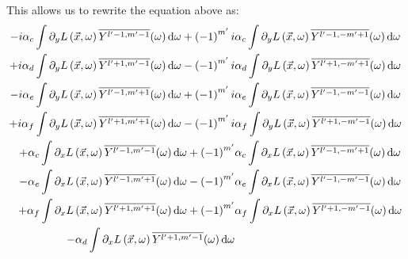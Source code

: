 \documentclass[10pt]{scrartcl}
\begin{document}
This allows us to rewrite the equation above as:
\begin{align*}
-i\alpha_c\int{\partial_yL\left (\vec{x} ,\omega \right )\overline{Y^{l'-1, m'-1}}(\omega )\ud\omega}
+\left({-1}\right)^{m'}i&\alpha_c\int{\partial_yL\left (\vec{x} ,\omega \right )\overline{Y^{l'-1, -m'+1}}(\omega )\ud\omega}
\\
+i\alpha_d\int{\partial_yL\left (\vec{x} ,\omega \right )\overline{Y^{l'+1, m'-1}}(\omega )\ud\omega}
-\left({-1}\right)^{m'} i &\alpha_d\int{\partial_yL\left (\vec{x} ,\omega \right )\overline{Y^{l'+1, -m'+1}}(\omega )\ud\omega}
\\
-i\alpha_e \int{\partial_yL\left (\vec{x} ,\omega \right )\overline{Y^{l'-1, m'+1}}(\omega )\ud\omega}
+\left({-1}\right)^{m'}i &\alpha_e \int{\partial_yL\left (\vec{x} ,\omega \right )\overline{Y^{l'-1, -m'-1}}(\omega )\ud\omega}
\\
+i\alpha_f \int{\partial_yL\left (\vec{x} ,\omega \right )\overline{Y^{l'+1, m'+1}}(\omega )\ud\omega}
-\left({-1}\right)^{m'}i &\alpha_f \int{\partial_yL\left (\vec{x} ,\omega \right )\overline{Y^{l'+1, -m'-1}}(\omega )\ud\omega}
\\
+\alpha_c\int{\partial_xL\left (\vec{x} ,\omega \right )\overline{Y^{l'-1, m'-1}}(\omega )\ud\omega}
+\left({-1}\right)^{m'}&\alpha_c\int{\partial_xL\left (\vec{x} ,\omega \right )\overline{Y^{l'-1, -m'+1}}(\omega )\ud\omega}
\\
-\alpha_e\int{\partial_xL\left (\vec{x} ,\omega \right )\overline{Y^{l'-1, m'+1}}(\omega )\ud\omega}
-\left({-1}\right)^{m'}&\alpha_e\int{\partial_xL\left (\vec{x} ,\omega \right )\overline{Y^{l'-1, -m'-1}}(\omega )\ud\omega}
\\
+\alpha_f\int{\partial_xL\left (\vec{x} ,\omega \right )\overline{Y^{l'+1, m'+1}}(\omega )\ud\omega}
+\left({-1}\right)^{m'}&\alpha_f\int{\partial_xL\left (\vec{x} ,\omega \right )\overline{Y^{l'+1, -m'-1}}(\omega )\ud\omega}
\\
-\alpha_d\int{\partial_xL\left (\vec{x} ,\omega \right )\overline{Y^{l'+1, m'-1}}(\omega )\ud\omega}

\end{align*}
\end{document}
